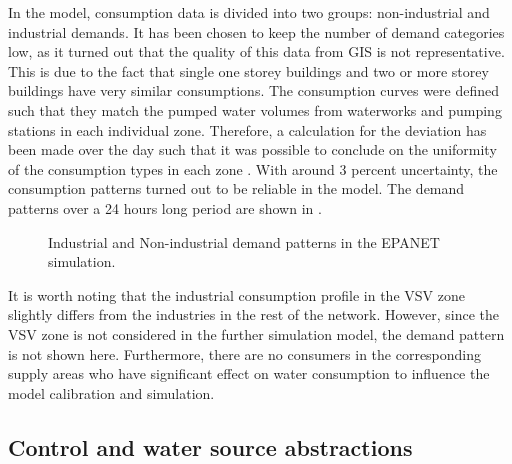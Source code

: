 In the model, consumption data is divided into two groups: non-industrial and industrial demands. It has been chosen to keep the number of demand categories low, as it turned out that the quality of this data from GIS is not representative. This is due to the fact that single one storey buildings and two or more storey buildings have very similar consumptions. The consumption curves were defined such that they match the pumped water volumes from waterworks and pumping stations in each individual zone. Therefore, a calculation for the deviation has been made over the day such that it was possible to conclude on the uniformity of the consumption types in each zone \cite{verdo_doc}. With around 3 percent uncertainty, the consumption patterns turned out to be reliable in the model. The demand patterns over a 24 hours long period are shown in  .

\begin{figure}[H]
\centering

\caption{Industrial and Non-industrial demand patterns in the EPANET simulation.}
\label{fig:demandpatterns_EPANET}
\end{figure}

\vspace{-3mm}

It is worth noting that the industrial consumption profile in the VSV zone slightly differs from the industries in the rest of the network. However, since the VSV zone is not considered in the further simulation model, the demand pattern is not shown here. Furthermore, there are no consumers in the corresponding supply areas who have  significant effect on water consumption to influence the model calibration and simulation. 

\subsection{Control and water source abstractions}
\label{control_and_water_source_abstractions}

